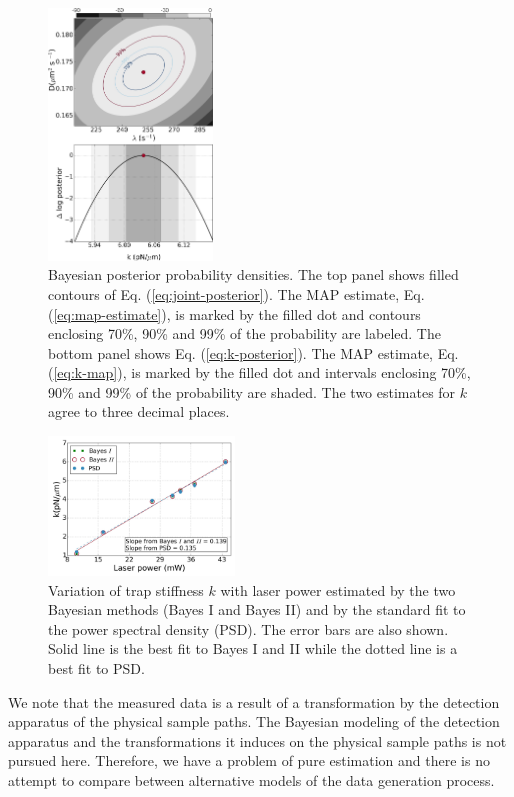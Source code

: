 \documentclass[english,aps, twocolumn, pre,superscriptaddress]{revtex4-1}
\begin{document}
\begin{figure}[h]
\includegraphics[width=0.39\textwidth]{figure3}

\caption{Bayesian posterior probability densities. The top panel shows filled
contours of Eq. (\ref{eq:joint-posterior}). The MAP estimate, Eq.
(\ref{eq:map-estimate}), is marked by the filled dot and contours
enclosing 70\%, 90\% and 99\% of the probability are labeled. The
bottom panel shows Eq. (\ref{eq:k-posterior}). The MAP estimate,
Eq. (\ref{eq:k-map}), is marked by the filled dot and intervals enclosing
70\%, 90\% and 99\% of the probability are shaded. The two estimates
for $k$ agree to three decimal places.\label{fig:bayes-I-and-II}}
\end{figure}

\begin{figure}[h]
\includegraphics[width=0.44\textwidth]{figure4}

\caption{Variation of trap stiffness $k$ with laser power estimated by the
two Bayesian methods (Bayes I and Bayes II) and by the standard fit
to the power spectral density (PSD). The error bars are also shown.
Solid line is the best fit to Bayes I and II while the dotted line
is a best fit to PSD.\label{fig:Variation-of-trap}}
\end{figure}

We note that the measured data is a result of a transformation by
the detection apparatus of the physical sample paths. The Bayesian
modeling of the detection apparatus and the transformations it induces
on the physical sample paths is not pursued here. Therefore, we have
a problem of pure estimation and there is no attempt to compare between
alternative models of the data generation process. 
\end{document}
